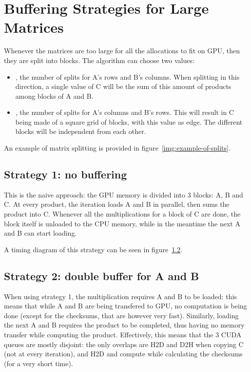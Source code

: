 \section{Buffering Strategies for Large Matrices}
\label{sec:strategies}


Whenever the matrices are too large for all the allocations to fit on GPU, then they are split into blocks.
The algorithm can choose two values:
\begin{itemize}
	\item {}, the number of splits for A's rows and B's columns. When splitting in this direction, a single value of C will be the sum of this amount of products among blocks of A and B.
	\item{}, the number of splits for A's columns and B's rows. This will result in C being made of a square grid of blocks, with this value as edge. The different blocks will be independent from each other.
\end{itemize}

An example of matrix splitting is provided in figure~\ref{img:example-of-splits}.


\subsection{Strategy 1: no buffering}

This is the naive approach: the GPU memory is divided into 3 blocks: A, B and C.
At every product, the iteration loads A and B in parallel, then sums the product into C.
Whenever all the multiplications for a block of C are done, the block itself is unloaded to the CPU memory, while in the meantime the next A and B can start loading.

A timing diagram of this strategy can be seen in figure~\ref{}.

\subsection{Strategy 2: double buffer for A and B}

When using strategy 1, the multiplication requires A and B to be loaded: this means that while A and B are being transfered to GPU, no computation is being done (except for the checksums, that are however very fast).
Similarly, loading the next A and B requires the product to be completed, thus having no memory transfer while computing the product.
Effectively, this means that the 3 CUDA queues are mostly disjoint: the only overlaps are H2D and D2H when copying C (not at every iteration), and H2D and compute while calculating the checksums (for a very short time).

